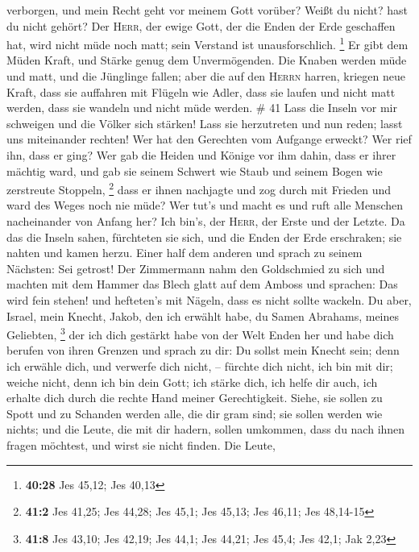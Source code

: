 verborgen, und mein Recht geht vor meinem Gott vorüber? 
Weißt du nicht? hast du nicht gehört? Der \textsc{Herr}, der ewige Gott,
der die Enden der Erde geschaffen hat, wird nicht müde noch matt; sein
Verstand ist unausforschlich. \footnote{\textbf{40:28} Jes 45,12; Jes
  40,13}  Er gibt dem Müden Kraft, und Stärke genug dem
Unvermögenden.  Die Knaben werden müde und matt, und die
Jünglinge fallen;  aber die auf den \textsc{Herrn}
harren, kriegen neue Kraft, dass sie auffahren mit Flügeln wie Adler,
dass sie laufen und nicht matt werden, dass sie wandeln und nicht müde
werden. \# 41  Lass die Inseln vor mir schweigen und die
Völker sich stärken! Lass sie herzutreten und nun reden; lasst uns
miteinander rechten!  Wer hat den Gerechten vom Aufgange
erweckt? Wer rief ihn, dass er ging? Wer gab die Heiden und Könige vor
ihm dahin, dass er ihrer mächtig ward, und gab sie seinem Schwert wie
Staub und seinem Bogen wie zerstreute Stoppeln, \footnote{\textbf{41:2}
  Jes 41,25; Jes 44,28; Jes 45,1; Jes 45,13; Jes 46,11; Jes 48,14-15}
 dass er ihnen nachjagte und zog durch mit Frieden und
ward des Weges noch nie müde?  Wer tut's und macht es und
ruft alle Menschen nacheinander von Anfang her? Ich bin's, der
\textsc{Herr}, der Erste und der Letzte.  Da das die
Inseln sahen, fürchteten sie sich, und die Enden der Erde erschraken;
sie nahten und kamen herzu.  Einer half dem anderen und
sprach zu seinem Nächsten: Sei getrost!  Der Zimmermann
nahm den Goldschmied zu sich und machten mit dem Hammer das Blech glatt
auf dem Amboss und sprachen: Das wird fein stehen! und hefteten's mit
Nägeln, dass es nicht sollte wackeln.  Du aber, Israel,
mein Knecht, Jakob, den ich erwählt habe, du Samen Abrahams, meines
Geliebten, \footnote{\textbf{41:8} Jes 43,10; Jes 42,19; Jes 44,1; Jes
  44,21; Jes 45,4; Jes 42,1; Jak 2,23}  der ich dich
gestärkt habe von der Welt Enden her und habe dich berufen von ihren
Grenzen und sprach zu dir: Du sollst mein Knecht sein; denn ich erwähle
dich, und verwerfe dich nicht, --  fürchte dich nicht,
ich bin mit dir; weiche nicht, denn ich bin dein Gott; ich stärke dich,
ich helfe dir auch, ich erhalte dich durch die rechte Hand meiner
Gerechtigkeit.  Siehe, sie sollen zu Spott und zu
Schanden werden alle, die dir gram sind; sie sollen werden wie nichts;
und die Leute, die mit dir hadern, sollen umkommen,  dass
du nach ihnen fragen möchtest, und wirst sie nicht finden. Die Leute,
